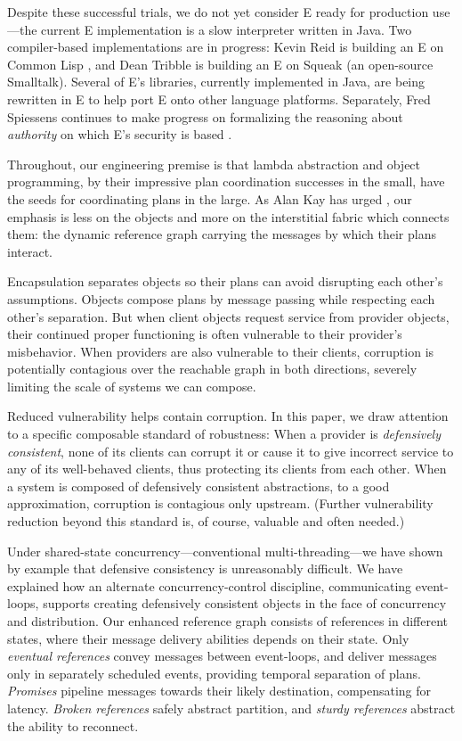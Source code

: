 \documentclass{llncs}
\begin{document}
Despite these successful trials, we do not yet consider E ready for
production use---the current E implementation is a slow interpreter
written in Java.  Two compiler-based implementations are in progress:
Kevin Reid is building an E on Common Lisp \cite{reid:e-on-cl}, and
Dean Tribble is building an E on Squeak (an open-source
Smalltalk). Several of E's libraries, currently implemented in Java,
are being rewritten in E to help port E onto other language
platforms. Separately, Fred Spiessens continues to make progress on
formalizing the reasoning about \emph{authority} on which E's security
is based \cite{tgc}.

Throughout, our engineering premise is that lambda abstraction and
object programming, by their impressive plan coordination successes in
the small, have the seeds for coordinating plans in the large. As Alan
Kay has urged \cite{kay:ma}, our emphasis is less on the objects and
more on the interstitial fabric which connects them: the dynamic
reference graph carrying the messages by which their plans interact.

Encapsulation separates objects so their plans can avoid disrupting
each other's assumptions. Objects compose plans by message passing
while respecting each other's separation.  But when client objects
request service from provider objects, their continued proper
functioning is often vulnerable to their provider's misbehavior. When
providers are also vulnerable to their clients, corruption is
potentially contagious over the reachable graph in both directions,
severely limiting the scale of systems we can compose.

Reduced vulnerability helps contain corruption. In this paper, we draw
attention to a specific composable standard of robustness: When a
provider is \emph{defensively consistent}, none of its clients can
corrupt it or cause it to give incorrect service to any of its
well-behaved clients, thus protecting its clients from each
other. When a system is composed of defensively consistent
abstractions, to a good approximation, corruption is contagious only
upstream. (Further vulnerability reduction beyond this standard is, of
course, valuable and often needed.)

Under shared-state concurrency---conventional multi-threading---we
have shown by example that defensive consistency is unreasonably
difficult. We have explained how an alternate concurrency-control
discipline, communicating event-loops, supports creating defensively
consistent objects in the face of concurrency and distribution. Our
enhanced reference graph consists of references in different states,
where their message delivery abilities depends on their state. Only
\emph{eventual references} convey messages between event-loops, and
deliver messages only in separately scheduled events, providing
temporal separation of plans. \emph{Promises} pipeline messages
towards their likely destination, compensating for
latency. \emph{Broken references} safely abstract partition, and
\emph{sturdy references} abstract the ability to reconnect.
\end{document}
